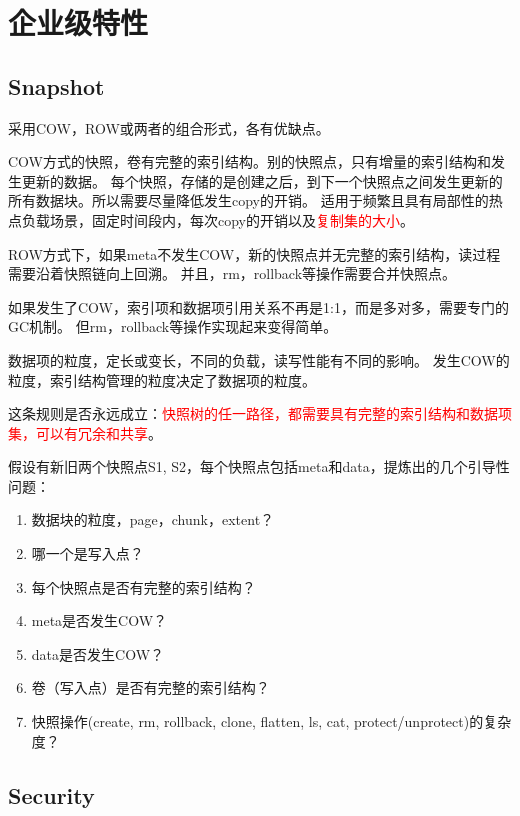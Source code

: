 \documentclass[UTF8]{ctexart}
\begin{document}
\section{企业级特性}

\subsection{Snapshot}

采用COW，ROW或两者的组合形式，各有优缺点。

COW方式的快照，卷有完整的索引结构。别的快照点，只有增量的索引结构和发生更新的数据。
每个快照，存储的是创建之后，到下一个快照点之间发生更新的所有数据块。所以需要尽量降低发生copy的开销。
适用于频繁且具有局部性的热点负载场景，固定时间段内，每次copy的开销以及\textcolor{red}{复制集的大小}。

ROW方式下，如果meta不发生COW，新的快照点并无完整的索引结构，读过程需要沿着快照链向上回溯。
并且，rm，rollback等操作需要合并快照点。

如果发生了COW，索引项和数据项引用关系不再是1:1，而是多对多，需要专门的GC机制。
但rm，rollback等操作实现起来变得简单。

数据项的粒度，定长或变长，不同的负载，读写性能有不同的影响。
发生COW的粒度，索引结构管理的粒度决定了数据项的粒度。

这条规则是否永远成立：\textcolor{red}{快照树的任一路径，都需要具有完整的索引结构和数据项集，可以有冗余和共享}。

\begin{tcolorbox}

假设有新旧两个快照点S1, S2，每个快照点包括meta和data，提炼出的几个引导性问题：

\begin{enumerate}
    \item 数据块的粒度，page，chunk，extent？
    \item 哪一个是写入点？
    \item 每个快照点是否有完整的索引结构？
    \item meta是否发生COW？
    \item data是否发生COW？
    \item 卷（写入点）是否有完整的索引结构？
    \item 快照操作(create, rm, rollback, clone, flatten, ls, cat, protect/unprotect)的复杂度？
\end{enumerate}

\end{tcolorbox}

\subsection{Security}
\end{document}
